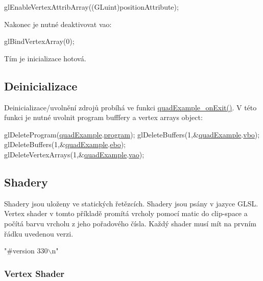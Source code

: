 \begin{DoxyCodeInclude}
  glEnableVertexAttribArray((GLuint)positionAttribute);
\end{DoxyCodeInclude}
Nakonec je nutné deaktivovat vao\-: 
\begin{DoxyCodeInclude}
  glBindVertexArray(0);
\end{DoxyCodeInclude}
Tím je inicializace hotová. \hypertarget{quadExample.c_Deinit}{}\subsection{Deinicializace}\label{quadExample.c_Deinit}
Deinicializace/uvolnění zdrojů probíhá ve funkci \hyperlink{quadExample_8c_a19bc4ebaa15f60078724033bde27d8b9}{quad\-Example\-\_\-on\-Exit()}. V této funkci je nutné uvolnit program bufffery a vertex arrays object\-: 
\begin{DoxyCodeInclude}
  glDeleteProgram(\hyperlink{quadExample_8c_ad961415145a9c30bd9846d4a278cc63a}{quadExample}.\hyperlink{structQuadExampleVariables_a63971781ff860bd201886926f943ba78}{program});
  glDeleteBuffers(1,&\hyperlink{quadExample_8c_ad961415145a9c30bd9846d4a278cc63a}{quadExample}.\hyperlink{structQuadExampleVariables_a69515fd546272c117e14f784221f6412}{vbo});
  glDeleteBuffers(1,&\hyperlink{quadExample_8c_ad961415145a9c30bd9846d4a278cc63a}{quadExample}.\hyperlink{structQuadExampleVariables_a3b1abdb0f18593a0ebec8dd9a222164b}{ebo});
  glDeleteVertexArrays(1,&\hyperlink{quadExample_8c_ad961415145a9c30bd9846d4a278cc63a}{quadExample}.\hyperlink{structQuadExampleVariables_a294c388653d62435d7eeb7994f45c4fc}{vao});
\end{DoxyCodeInclude}
\hypertarget{quadExample.c_Shaders}{}\subsection{Shadery}\label{quadExample.c_Shaders}
Shadery jsou uloženy ve statických řetězcích. Shadery jsou psány v jazyce G\-L\-S\-L. Vertex shader v tomto příkladě promítá vrcholy pomocí matic do clip-\/space a počítá barvu vrcholu z jeho pořadového čísla. Každý shader musí mít na prvním řádku uvedenou verzi. 
\begin{DoxyCodeInclude}
\textcolor{stringliteral}{"#version 330\(\backslash\)n"}
\end{DoxyCodeInclude}
\hypertarget{quadExample.c_VertexShader}{}\subsubsection{Vertex Shader}\label{quadExample.c_VertexShader}
